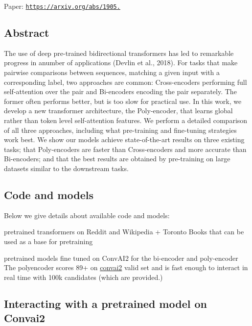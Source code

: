 Paper\+: \href{https://arxiv.org/abs/1905.01969}{\tt https\+://arxiv.\+org/abs/1905.}

\subsection*{Abstract}

The use of deep pre-\/trained bidirectional transformers has led to remarkable progress in anumber of applications (Devlin et al., 2018). For tasks that make pairwise comparisons between sequences, matching a given input with a corresponding label, two approaches are common\+: Cross-\/encoders performing full self-\/attention over the pair and Bi-\/encoders encoding the pair separately. The former often performs better, but is too slow for practical use. In this work, we develop a new transformer architecture, the Poly-\/encoder, that learns global rather than token level self-\/attention features. We perform a detailed comparison of all three approaches, including what pre-\/training and fine-\/tuning strategies work best. We show our models achieve state-\/of-\/the-\/art results on three existing tasks; that Poly-\/encoders are faster than Cross-\/encoders and more accurate than Bi-\/encoders; and that the best results are obtained by pre-\/training on large datasets similar to the downstream tasks.

\subsection*{Code and models}

Below we give details about available code and models\+:
\begin{DoxyItemize}
\item pretrained transformers on Reddit and Wikipedia + Toronto Books that can be used as a base for pretraining
\begin{DoxyItemize}
\item pretrained models fine tuned on Conv\+A\+I2 for the bi-\/encoder and poly-\/encoder The polyencoder scores 89+ on \hyperlink{namespaceconvai2}{convai2} valid set and is fast enough to interact in real time with 100k candidates (which are provided.)
\end{DoxyItemize}
\end{DoxyItemize}

\subsection*{Interacting with a pretrained model on Convai2}

